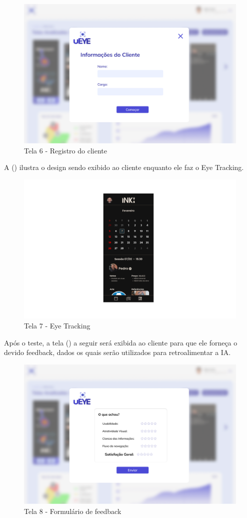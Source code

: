 \begin{figure}[H]
    \centering
    \caption{Tela 6 - Registro do cliente}%
    \label{fig:pg-tela6}
    \includegraphics[width=0.72\linewidth]{Illustrations/tela6.png}
\end{figure}

A () ilustra o design sendo exibido ao cliente enquanto ele faz o Eye Tracking.

\begin{figure}[H]
    \centering
    \caption{Tela 7 - Eye Tracking}%
    \label{fig:pg-tela7}
    \includegraphics[width=0.72\linewidth]{Illustrations/tela7.png}
\end{figure}

Após o teste, a tela () a seguir será exibida ao cliente para que ele forneça o devido feedback, dados os quais serão utilizados para retroalimentar a IA.

\begin{figure}[H]
    \centering
    \caption{Tela 8 - Formulário de feedback}%
    \label{fig:pg-tela8}
    \includegraphics[width=0.72\linewidth]{Illustrations/tela8.png}
\end{figure}

